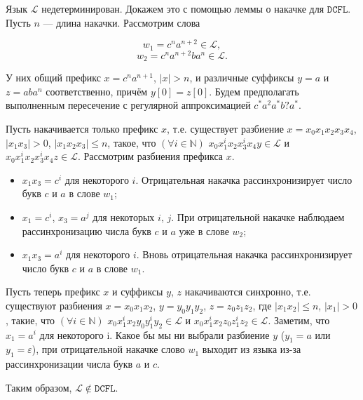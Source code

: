 \documentclass{article}
\begin{document}
Язык $\mathcal{L}$ недетерминирован. Докажем это с помощью леммы о накачке
для $\mathtt{DCFL}$. Пусть $n$ --- длина накачки. Рассмотрим слова

\[w_1 = c^n a^{n+2} \in \mathcal{L},\]
\[w_2 = c^n a^{n+2} b a^n \in \mathcal{L}.\]

У них общий префикс $x = c^n a^{n+1}$, $|x| > n$, и различные суффиксы
$y = a$ и $z = a b a^n$ соответственно, причём $y[0] = z[0]$. Будем предполагать
выполненным пересечение с регулярной аппроксимацией $c^* a^2 a^* b? a^*$.

Пусть накачивается только префикс $x$, т.е. существует разбиение $x = x_0 x_1 x_2 x_3
x_4$, $|x_1 x_3| > 0$, $|x_1 x_2 x_3| \le n$, такое, что $(\forall i \in
\mathbb{N})$ $x_0 x_1^i x_2 x_3^i x_4 y \in \mathcal{L}$ и $x_0 x_1^i x_2
x_3^i x_4 z \in \mathcal{L}$. Рассмотрим разбиения префикса $x$.

\begin{itemize}
  \item $x_1 x_3 = c^i$ для некоторого $i$. Отрицательная накачка
    рассинхронизирует число букв $c$ и $a$ в слове $w_1$;
  \item $x_1 = c^i$, $x_3 = a^j$ для некоторых $i$, $j$. При отрицательной
    накачке наблюдаем рассинхронизацию числа букв $c$ и $a$ уже в слове $w_2$;
  \item $x_1 x_3 = a^i$ для некоторого $i$. Вновь отрицательная накачка
    рассинхронизирует число букв $c$ и $a$ в слове $w_1$.
\end{itemize}

Пусть теперь префикс $x$ и суффиксы $y$, $z$ накачиваются синхронно, т.е.
существуют разбиения $x = x_0 x_1 x_2$, $y = y_0 y_1 y_2$, $z = z_0 z_1 z_2$,
где $|x_1 x_2| \le n$, $|x_1| > 0$, такие, что $(\forall i \in \mathbb{N})$
$x_0 x_1^i x_2 y_0 y_1^i y_2 \in \mathcal{L}$ и $x_0 x_1^i x_2 z_0 z_1^i z_2
\in \mathcal{L}$. Заметим, что $x_1 = a^i$ для некоторого i. Какое бы мы ни
выбрали разбиение $y$ ($y_1 = a$ или $y_1 = \varepsilon$), при отрицательной
накачке слово $w_1$ выходит из языка из-за рассинхронизации числа букв $a$ и
$c$.

Таким образом, $\mathcal{L} \notin \mathtt{DCFL}$.
\end{document}
